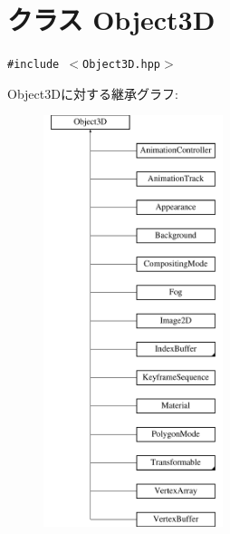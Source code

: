 \hypertarget{classm3g_1_1Object3D}{
\section{クラス Object3D}
\label{classm3g_1_1Object3D}
}
{\tt \#include $<$Object3D.hpp$>$}

Object3Dに対する継承グラフ:\begin{figure}[H]
\begin{center}
\leavevmode
\includegraphics[height=12cm]{classm3g_1_1Object3D}
\end{center}
\end{figure}
